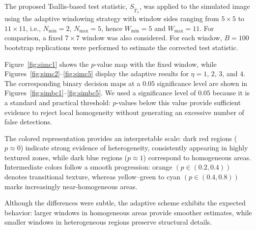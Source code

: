 \documentclass[
  lettersize  journal,
]{IEEEtran}%
\begin{document}
The proposed Tsallis-based test statistic,
\(S_{\widetilde{T}_{\lambda}}\), was applied to the simulated image
using the adaptive windowing strategy with window sides ranging from
\(5\times5\) to \(11\times11\), i.e., \(N_{\min}=2\), \(N_{\max}=5\),
hence \(W_{\min}=5\) and \(W_{\max}=11\). For comparison, a fixed
\(7\times7\) window was also considered. For each window, \(B=100\)
bootstrap replications were performed to estimate the corrected test
statistic.

Figure~\ref{fig:simc1} shows the \(p\)-value map with the fixed window,
while Figures~\ref{fig:simc2}--\ref{fig:simc5} display the adaptive
results for \(\eta=1\), \(2\), \(3\), and \(4\). The corresponding
binary decision maps at a \(0.05\) significance level are shown in
Figures~\ref{fig:simbc1}--\ref{fig:simbc5}. We used a significance level
of \(0.05\) because it is a standard and practical threshold:
\(p\)-values below this value provide sufficient evidence to reject
local homogeneity without generating an excessive number of false
detections.

The colored representation provides an interpretable scale: dark red
regions (\(p \approx 0\)) indicate strong evidence of heterogeneity,
consistently appearing in highly textured zones, while dark blue regions
(\(p \approx 1\)) correspond to homogeneous areas. Intermediate colors
follow a smooth progression: orange \((p\in (0.2,0.4))\) denotes
transitional texture, whereas yellow--green to cyan \((p\in (0.4,0.8))\)
marks increasingly near-homogeneous areas.

Although the differences were subtle, the adaptive scheme exhibits the
expected behavior: larger windows in homogeneous areas provide smoother
estimates, while smaller windows in heterogeneous regions preserve
structural details.

\setlength{\dblfloatsep}{6pt}
\setlength{\dbltextfloatsep}{6pt}
\setlength{\textfloatsep}{6pt}
\captionsetup{font=footnotesize}
\captionsetup[sub]{aboveskip=2pt,belowskip=2pt}
\end{document}
